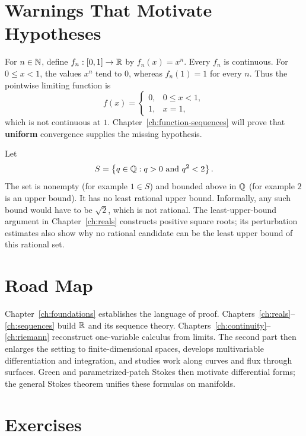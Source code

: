 \section{Warnings That Motivate Hypotheses}

\begin{example}
For $n\in\mathbb{N}$, define $f_n:[0,1]\to\mathbb{R}$ by $f_n(x)=x^n$. Every $f_n$ is continuous. For $0\leq x<1$, the values $x^n$ tend to $0$, whereas $f_n(1)=1$ for every $n$. Thus the pointwise limiting function is
\[
f(x)=\begin{cases}0,&0\leq x<1,\\1,&x=1,\end{cases}
\]
which is not continuous at $1$. Chapter~\ref{ch:function-sequences} will prove that \textbf{uniform} convergence supplies the missing hypothesis.
\end{example}

\begin{example}
Let
\[
S=\left\{q\in\mathbb{Q}:q>0\text{ and }q^2<2\right\}.
\] The set is nonempty (for example $1\in S$) and bounded above in $\mathbb{Q}$ (for example $2$ is an upper bound). It has no least rational upper bound. Informally, any such bound would have to be $\sqrt2$, which is not rational. The least-upper-bound argument in Chapter~\ref{ch:reals} constructs positive square roots; its perturbation estimates also show why no rational candidate can be the least upper bound of this rational set.
\end{example}

\section{Road Map}

Chapter~\ref{ch:foundations} establishes the language of proof. Chapters~\ref{ch:reals}--\ref{ch:sequences} build $\mathbb{R}$ and its sequence theory. Chapters~\ref{ch:continuity}--\ref{ch:riemann} reconstruct one-variable calculus from limits. The second part then enlarges the setting to finite-dimensional spaces, develops multivariable differentiation and integration, and studies work along curves and flux through surfaces. Green and parametrized-patch Stokes then motivate differential forms; the general Stokes theorem unifies these formulas on manifolds.

\section*{Exercises}

